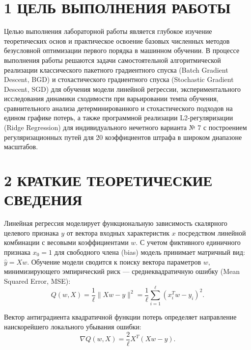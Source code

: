 \documentclass[14pt,a4paper]{extarticle}
\begin{document}
\section*{1 ЦЕЛЬ ВЫПОЛНЕНИЯ РАБОТЫ}

Целью выполнения лабораторной работы является глубокое изучение теоретических основ и практическое освоение базовых численных методов безусловной оптимизации первого порядка в машинном обучении. В процессе выполнения работы решаются задачи самостоятельной алгоритмической реализации классического пакетного градиентного спуска (Batch Gradient Descent, BGD) и стохастического градиентного спуска (Stochastic Gradient Descent, SGD) для обучения модели линейной регрессии, экспериментального исследования динамики сходимости при варьировании темпа обучения, сравнительного анализа детерминированного и стохастического подходов на едином графике потерь, а также программной реализации L2-регуляризации (Ridge Regression) для индивидуального нечетного варианта № 7 с построением регуляризационных путей для 20 коэффициентов штрафа в широком диапазоне масштабов.

\section*{2 КРАТКИЕ ТЕОРЕТИЧЕСКИЕ СВЕДЕНИЯ}

Линейная регрессия моделирует функциональную зависимость скалярного целевого признака $y$ от вектора входных характеристик $x$ посредством линейной комбинации с весовыми коэффициентами $w$. С учетом фиктивного единичного признака $x_0 = 1$ для свободного члена (bias) модель принимает матричный вид: $\hat{y} = X w$. Обучение модели сводится к поиску вектора параметров $w$, минимизирующего эмпирический риск --- среднеквадратичную ошибку (Mean Squared Error, MSE):
\begin{equation}
Q(w, X) = \frac{1}{\ell} \|X w - y\|^2 = \frac{1}{\ell} \sum_{i=1}^\ell (x_i^T w - y_i)^2.
\end{equation}

Вектор антиградиента квадратичной функции потерь определяет направление наискорейшего локального убывания ошибки:
\begin{equation}
\nabla Q(w, X) = \frac{2}{\ell} X^T (X w - y).
\end{equation}
\end{document}
